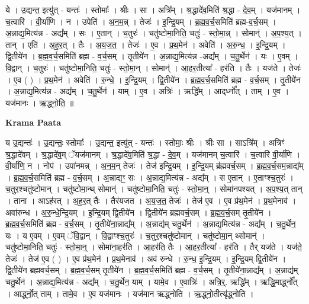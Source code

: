 \documentclass[17pt]{extarticle}
\begin{document}
ये । उ॒द्यन्त॒ इत्यु॑त् - यन्तः॑ । स्तोमाः᳚ । श्रीः । सा । अत्रि᳚म् । श्र॒द्धादे॑व॒मिति॑ श्र॒द्धा - दे॒व॒म् । यज॑मानम् । च॒त्वारि॑ । वी॒र्या॑णि । न । उपेति॑ । अ॒न॒म॒न्न् । तेजः॑ । इ॒न्द्रि॒यम् । ब्र॒ह्म॒व॒र्च॒समिति॑ ब्रह्म-व॒र्च॒सम् । अ॒न्नाद्य॒मित्य॑न्न - अद्य᳚म् । सः । ए॒तान् । च॒तुरः॑ । चतु॑ष्टोमा॒निति॒ चतुः॑ - स्तो॒मा॒न्न् । सोमान्॑ । अ॒प॒श्य॒त् । तान् । एति॑ । अ॒ह॒र॒त् । तैः । अ॒य॒ज॒त॒ । तेजः॑ । ए॒व । प्र॒थ॒मेन॑ । अवेति॑ । अ॒रु॒न्ध॒ । इ॒न्द्रि॒यम् । द्वि॒तीये॑न । ब्र॒ह्म॒व॒र्च॒समिति॑ ब्रह्म - व॒र्च॒सम् । तृ॒तीये॑न । अ॒न्नाद्य॒मित्य॑न्न -अद्य᳚म् । च॒तु॒र्थेन॑ । यः । ए॒वम् । वि॒द्वान् । च॒तुरः॑ । चतु॑ष्टोमा॒निति॒ चतुः॑ - स्तो॒मा॒न् । सोमान्॑ । आ॒हर॒तीत्या᳚ - हर॑ति । तैः । यज॑ते । तेजः॑ । ए॒व ( ) । प्र॒थ॒मेन॑ । अवेति॑ । रु॒न्धे॒ । इ॒न्द्रि॒यम् । द्वि॒तीये॑न । ब्र॒ह्म॒व॒र्च॒समिति॑ ब्रह्म - व॒र्च॒सम् । तृ॒तीये॑न । अ॒न्नाद्य॒मित्य॑न्न - अद्य᳚म् । च॒तु॒र्थेन॑ । याम् । ए॒व । अत्रिः॑ । ऋद्धि᳚म् । आद्‌र्ध्नो᳚त् । ताम् । ए॒व । यज॑मानः । ऋ॒द्ध्नो॒ति॒ ॥  \newline


\textbf{Krama Paata} \newline

य उ॒द्यन्तः॑ । उ॒द्यन्तः॒ स्तोमाः᳚ । उ॒द्यन्त॒ इत्यु॑त् - यन्तः॑ । स्तोमाः॒ श्रीः । श्रीः सा । साऽत्रि᳚म् । अत्रिꣳ॑ श्र॒द्धादे॑वम् । श्र॒द्धादे॑व॒म् ॅयज॑मानम् । श्र॒द्धादे॑व॒मिति॑ श्र॒द्धा - दे॒व॒म् । यज॑मानम् च॒त्वारि॑ । च॒त्वारि॑ वी॒र्या॑णि । वी॒र्या॑णि॒ न । नोप॑ । उपा॑नमन्न् । अ॒न॒म॒न् तेजः॑ । तेज॑ इन्द्रि॒यम् । इ॒न्द्रि॒यम् ब्र॑ह्मवर्च॒सम् । ब्र॒ह्म॒व॒र्च॒सम॒न्नाद्य᳚म् । ब्र॒ह्म॒व॒र्च॒समिति॑ ब्रह्म - व॒र्च॒सम् । अ॒न्नाद्यꣳ॒॒ सः । अ॒न्नाद्य॒मित्य॑न्न - अद्य᳚म् । स ए॒तान् । ए॒ताꣳश्च॒तुरः॑ । च॒तुर॒श्चतु॑ष्टोमान् । चतु॑ष्टोमा॒न्थ् सोमान्॑ । चतु॑ष्टोमा॒निति॒ चतुः॑ - स्तो॒मा॒न्॒ । सोमा॑नपश्यत् । अ॒प॒श्य॒त् तान् । ताना । आऽह॑रत् । अ॒ह॒र॒त् तैः । तैर॑यजत । अ॒य॒ज॒त॒ तेजः॑ । तेज॑ ए॒व । ए॒व प्र॑थ॒मेन॑ । प्र॒थ॒मेनाव॑ । अवा॑रुन्ध । अ॒रु॒न्धे॒न्द्रि॒यम् । इ॒न्द्रि॒यम् द्वि॒तीये॑न । द्वि॒तीये॑न ब्रह्मवर्च॒सम् । ब्र॒ह्म॒व॒र्च॒सम् तृ॒तीये॑न । ब्र॒ह्म॒व॒र्च॒समिति॑ ब्रह्म - व॒र्च॒सम् । तृ॒तीये॑ना॒न्नाद्य᳚म् । अ॒न्नाद्य॑म् चतु॒र्थेन॑ । अ॒न्नाद्य॒मित्य॑न्न - अद्य᳚म् । च॒तु॒र्थेन॒ यः । य ए॒वम् । ए॒वम् ॅवि॒द्वान् । वि॒द्वाꣳश्च॒तुरः॑ । च॒तुर॒श्चतु॑ष्टोमान् । चतु॑ष्टोमा॒न् थ्सोमान्॑ । चतु॑ष्टोमा॒निति॒ चतुः॑ - स्तो॒मा॒न्॒ । सोमा॑ना॒हर॑ति । आ॒हर॑ति॒ तैः । आ॒हर॒तीत्या᳚ - हर॑ति । तैर् यज॑ते । यज॑ते॒ तेजः॑ । तेज॑ ए॒व ( ) । ए॒व प्र॑थ॒मेन॑ । प्र॒थ॒मेनाव॑ । अव॑ रुन्धे । रु॒न्ध॒ इ॒न्द्रि॒यम् । इ॒न्द्रि॒यम् द्वि॒तीये॑न । द्वि॒तीये॑न ब्रह्मवर्च॒सम् । ब्र॒ह्म॒व॒र्च॒सम् तृ॒तीये॑न । ब्र॒ह्म॒व॒र्च॒समिति॑ ब्रह्म - व॒र्च॒सम् । तृ॒तीये॑ना॒न्नाद्य᳚म् । अ॒न्नाद्य॑म् चतु॒र्थेन॑ । अ॒न्नाद्य॒मित्य॑न्न - अद्य᳚म् । च॒तु॒र्थेन॒ याम् । यामे॒व । ए॒वात्रिः॑ । अत्रि॒र्॒. ऋद्धि᳚म् । ऋद्धि॒मार्द्ध्नो᳚त् । आर्द्ध्नो॒त् ताम् । तामे॒व । ए॒व यज॑मानः । यज॑मान ऋद्ध्नोति । ऋ॒द्ध्नो॒तीत्यृ॑द्ध्नोति । \newline
\end{document}
